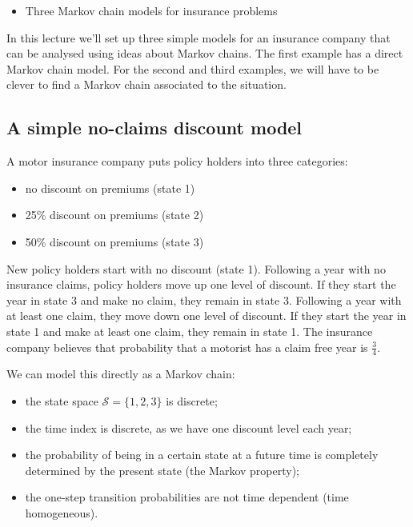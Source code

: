 \documentclass[
  a4paper,
]{article}
\providecommand{\tightlist}{%
  \setlength{\itemsep}{0pt}\setlength{\parskip}{0pt}}
\theoremstyle{definition}
\theoremstyle{definition}
\theoremstyle{definition}
\theoremstyle{remark}
\begin{document}
\begin{itemize}
\tightlist
\item
  Three Markov chain models for insurance problems
\end{itemize}

In this lecture we'll set up three simple models for an insurance company that can be analysed using ideas about Markov chains. The first example has a direct Markov chain model. For the second and third examples, we will have to be clever to find a Markov chain associated to the situation.

\hypertarget{S06-example1}{%
\subsection{A simple no-claims discount model}\label{S06-example1}}

A motor insurance company puts policy holders into three categories:

\begin{itemize}
\tightlist
\item
  no discount on premiums (state 1)
\item
  25\% discount on premiums (state 2)
\item
  50\% discount on premiums (state 3)
\end{itemize}

New policy holders start with no discount (state 1). Following a year with no insurance claims, policy holders move up one level of discount. If they start the year in state 3 and make no claim, they remain in state 3. Following a year with at least one claim, they move down one level of discount. If they start the year in state 1 and make at least one claim, they remain in state 1. The insurance company believes that probability that a motorist has a claim free year is \(\frac34\).

We can model this directly as a Markov chain:

\begin{itemize}
\tightlist
\item
  the state space \(\mathcal S = \{1,2,3\}\) is discrete;
\item
  the time index is discrete, as we have one discount level each year;
\item
  the probability of being in a certain state at a future time is completely determined by the present state (the Markov property);
\item
  the one-step transition probabilities are not time dependent (time homogeneous).
\end{itemize}
\end{document}
